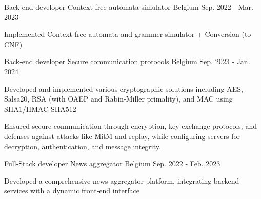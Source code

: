 

\begin{cventries}

  \cventry
    {Back‑end developer} %
    {Context free automata simulator} %
    {Belgium} %
    {Sep. 2022 ‑ Mar. 2023} %
    {
      \begin{cvitems} %
        \item {Implemented Context free automata and grammer simulator + Conversion (to CNF)}
      \end{cvitems}
    }
  

  \cventry
    {Back‑end developer} %
    {Secure communication protocols} %
    {Belgium} %
    {Sep. 2023 ‑ Jan. 2024} %
    {
      \begin{cvitems} %
        \item {Developed and implemented various cryptographic solutions including AES, Salsa20, RSA (with OAEP and Rabin-Miller primality), and MAC using SHA1/HMAC-SHA512}
        \item {Ensured secure communication through encryption, key exchange protocols, and defenses against attacks like MitM and replay, while configuring servers for decryption, authentication, and message integrity.}
      \end{cvitems}
    }


  \cventry
    {Full‑Stack developer} %
    {News aggregator} %
    {Belgium} %
    {Sep. 2022 ‑ Feb. 2023} %
    {
      \begin{cvitems} %
        \item {Developed a comprehensive news aggregator platform, integrating backend services with a dynamic front‑end interface}
      \end{cvitems}
    }


\end{cventries}
